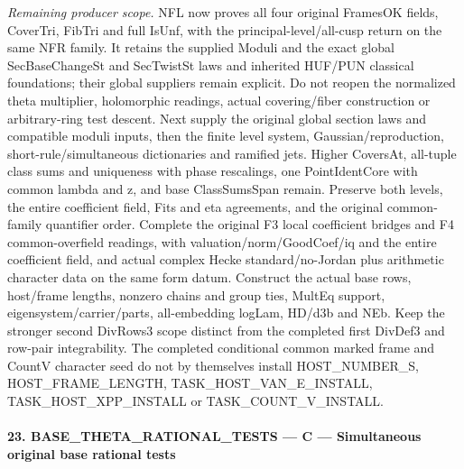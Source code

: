 \emph{Remaining producer scope.} NFL now proves all four original FramesOK fields, CoverTri, FibTri and full IsUnf, with the principal-level/all-cusp return on the same NFR family. It retains the supplied Moduli and the exact global SecBaseChangeSt and SecTwistSt laws and inherited HUF/PUN classical foundations; their global suppliers remain explicit. Do not reopen the normalized theta multiplier, holomorphic readings, actual covering/fiber construction or arbitrary-ring test descent. Next supply the original global section laws and compatible moduli inputs, then the finite level system, Gaussian/reproduction, short-rule/simultaneous dictionaries and ramified jets. Higher CoversAt, all-tuple class sums and uniqueness with phase rescalings, one PointIdentCore with common lambda and z, and base ClassSumsSpan remain. Preserve both levels, the entire coefficient field, Fits and eta agreements, and the original common-family quantifier order. Complete the original F3 local coefficient bridges and F4 common-overfield readings, with valuation/norm/GoodCoef/iq and the entire coefficient field, and actual complex Hecke standard/no-Jordan plus arithmetic character data on the same form datum. Construct the actual base rows, host/frame lengths, nonzero chains and group ties, MultEq support, eigensystem/carrier/parts, all-embedding logLam, HD/d3b and NEb. Keep the stronger second DivRows3 scope distinct from the completed first DivDef3 and row-pair integrability. The completed conditional common marked frame and CountV character seed do not by themselves install HOST\_\allowbreak NUMBER\_\allowbreak S, HOST\_\allowbreak FRAME\_\allowbreak LENGTH, TASK\_\allowbreak HOST\_\allowbreak VAN\_\allowbreak E\_\allowbreak INSTALL, TASK\_\allowbreak HOST\_\allowbreak XPP\_\allowbreak INSTALL or TASK\_\allowbreak COUNT\_\allowbreak V\_\allowbreak INSTALL.



\paragraph{23. BASE\_\allowbreak THETA\_\allowbreak RATIONAL\_\allowbreak TESTS — C — Simultaneous original base rational tests}

